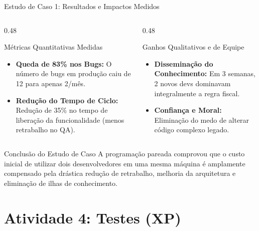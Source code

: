 \documentclass[aspectratio=169, 9pt]{beamer}
\begin{document}
\begin{frame}{Estudo de Caso 1: Resultados e Impactos Medidos}
  \begin{columns}[T]
    \begin{column}{0.48\textwidth}
      \begin{exampleblock}{Métricas Quantitativas Medidas}
        \begin{itemize}
          \item \textbf{Queda de 83\% nos Bugs:} O número de bugs em produção caiu de 12 para apenas 2/mês.
          \item \textbf{Redução do Tempo de Ciclo:} Redução de 35\% no tempo de liberação da funcionalidade (menos retrabalho no QA).
        \end{itemize}
      \end{exampleblock}
    \end{column}

    \begin{column}{0.48\textwidth}
      \begin{alertblock}{Ganhos Qualitativos e de Equipe}
        \begin{itemize}
          \item \textbf{Disseminação do Conhecimento:} Em 3 semanas, 2 novos devs dominavam integralmente a regra fiscal.
          \item \textbf{Confiança e Moral:} Eliminação do medo de alterar código complexo legado.
        \end{itemize}
      \end{alertblock}
    \end{column}
  \end{columns}

  \vspace{0.3cm}

  \begin{block}{Conclusão do Estudo de Caso}
    A programação pareada comprovou que o custo inicial de utilizar dois desenvolvedores em uma mesma máquina é amplamente compensado pela drástica redução de retrabalho, melhoria da arquitetura e eliminação de ilhas de conhecimento.
  \end{block}
\end{frame}

\section{Atividade 4: Testes (XP)}
\end{document}
